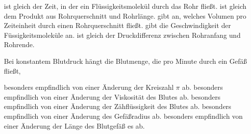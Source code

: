 \documentclass[11pt]{exam}
\begin{document}
\begin{questions}
\begin{choices}
	\choice ist gleich der Zeit, in der ein Flüssigkeitsmolekül durch das Rohr fließt.
	\choice ist gleich dem Produkt aus Rohrquerschnitt und Rohrlänge.
	\choice gibt an, welches Volumen pro Zeiteinheit durch einen Rohrquerschnitt fließt.
	\choice gibt die Geschwindigkeit der Füssigkeitsmoleküle an.
	\choice ist gleich der Druckdifferenz zwischen Rohranfang und Rohrende.
\end{choices}

\vspace{3mm}\question Bei konstantem Blutdruck hängt die Blutmenge, die pro Minute durch ein Gefäß fließt,

\begin{choices}
	\choice besonders empfindlich von einer Änderung der Kreiszahl \(\pi\) ab.
	\choice besonders empfindlich von einer Änderung der Viskosität des Blutes ab.
	\choice besonders empfindlich von einer Änderung der Zähflüssigkeit des Blutes ab.
	\choice besonders empfindlich von einer Änderung des Gefäßradius ab.
	\choice besonders empfindlich von einer Änderung der Länge des Blutgefäß es ab.
\end{choices}

\vspace{3mm}\end{questions}
\end{document}
